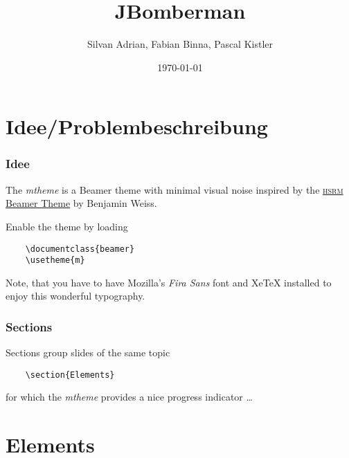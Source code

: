 \documentclass[10pt, compress]{beamer}
\title{JBomberman}
\subtitle{}
\date{\today}
\author{Silvan Adrian, Fabian Binna, Pascal Kistler}
\institute{Hochschule für Technik Rapperswil}
\begin{document}
\maketitle

\section{Idee/Problembeschreibung}

\begin{frame}[fragile]
  \frametitle{Idee}

  The \emph{mtheme} is a Beamer theme with minimal visual noise inspired by the
  \href{https://github.com/hsrmbeamertheme/hsrmbeamertheme}{\textsc{hsrm} Beamer
  Theme} by Benjamin Weiss.

  Enable the theme by loading

  \begin{verbatim}    \documentclass{beamer}
    \usetheme{m}\end{verbatim}

  Note, that you have to have Mozilla's \emph{Fira Sans} font and XeTeX
  installed to enjoy this wonderful typography.
\end{frame}

\begin{frame}[fragile]
  \frametitle{Sections}
  Sections group slides of the same topic

  \begin{verbatim}    \section{Elements}\end{verbatim}

  for which the \emph{mtheme} provides a nice progress indicator \ldots
\end{frame}

\section{Elements}
\end{document}

